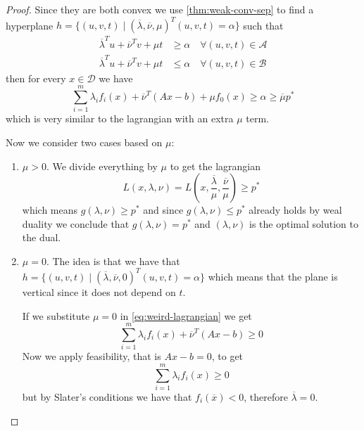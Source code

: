 \documentclass[12pt]{extarticle}
\begin{document}
\begin{proof}
	Since they are both convex we use \cref{thm:weak-conv-sep} to find a hyperplane
	$h = \{(u, v, t) \mid (\overline \lambda, \overline \nu, \mu)^T (u, v, t) = \alpha \}$
	such that
	\begin{align}
		\overline \lambda^T u + \overline \nu^T v + \mu t & \geq \alpha \quad \forall (u, v, t) \in \mathcal A \\
		\overline \lambda^T u + \overline \nu^T v + \mu t & \leq \alpha \quad \forall (u, v, t) \in \mathcal B
	\end{align}
	then for every $x \in \mathcal D$ we have
	\begin{equation}
		\sum_{i = 1}^m \lambda_i f_i(x) + \overline \nu^T(Ax - b) + \mu f_0(x) \geq \alpha \geq \overline \mu p^*
		\label{eq:weird-lagrangian}
	\end{equation}
	which is very similar to the lagrangian with an extra $\mu$ term.

	Now we consider two cases based on $\mu$:
	\begin{enumerate}[label=\roman*.]
		\item $\mu > 0$. We divide everything by $\mu$ to get the lagrangian
		      \begin{equation}
			      L(x, \lambda, \nu) =
			      L\left( x, \frac{\overline \lambda}{\mu}, \frac{\overline \nu}{\mu} \right)
			      \geq p^*
		      \end{equation}
		      which means $g(\lambda, \nu) \geq p^*$ and since $g(\lambda, \nu)\leq p^*$ already holds
		      by weal duality we conclude that $g(\lambda, \nu) = p^*$ and $(\lambda, \nu)$ is the
		      optimal solution to the dual.
		\item $\mu = 0$.
		      The idea is that we have that
		      $h = \{(u, v, t) \mid (\overline \lambda, \overline \nu, 0)^T (u, v, t) = \alpha \}$
		      which means that the plane is vertical since it does not depend on $t$.

		      If we substitute $\mu = 0$ in \cref{eq:weird-lagrangian} we get
		      \begin{equation}
			      \sum_{i = 1}^m \lambda_i f_i(x) + \overline \nu^T(Ax - b)  \geq 0
		      \end{equation}
		      Now we apply feasibility, that is $Ax - b = 0$, to get
		      \begin{equation}
			      \sum_{i = 1}^m \lambda_i f_i(x) \geq 0
		      \end{equation}
		      but by Slater's conditions we have that $f_i(\overline x) < 0$,
		      therefore $\overline \lambda = 0$.


\end{enumerate}
\end{proof}
\end{document}
